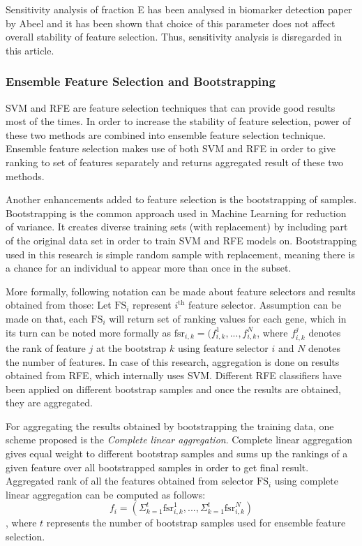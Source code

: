 \documentclass{ba-kecs}
\numberwithin{figure}{section}
\numberwithin{equation}{section}
\begin{document}
Sensitivity analysis of fraction E has been analysed in biomarker detection paper by Abeel \cite{bootstrapping} and it has been shown that choice of this parameter does not affect overall stability of feature selection. Thus, sensitivity analysis is disregarded in this article.



\subsubsection{Ensemble Feature Selection and Bootstrapping}

SVM and RFE are feature selection techniques that can provide good results most of the times. In order to increase the stability of feature selection, power of these two methods are combined into ensemble feature selection technique. Ensemble feature selection makes use of both SVM and RFE in order to give ranking to set of features separately and returns aggregated result of these two methods.

Another enhancements added to feature selection is the bootstrapping of samples. Bootstrapping is the common approach used in Machine Learning for reduction of variance. It creates diverse training sets (with replacement) by including part of the original data set in order to train SVM and RFE models on. Bootstrapping used in this research is simple random sample with replacement, meaning there is a chance for an individual to appear more than once in the subset. 

More formally, following notation can be made about feature selectors and results obtained from those: Let $\mathrm{FS}_{i}$ represent $i^{\mathrm{th}}$ feature selector. Assumption can be made on that, each $\mathrm{FS}_{i}$ will return set of ranking values for each gene, which in its turn can be noted more formally as $\mathrm{fsr}_{i,k} = (f_{i,k}^{1},...,f_{i,k}^{N}$, where $f_{i,k}^{j}$ denotes the rank of feature $j$ at the bootstrap $k$ using feature selector $i$ and $N$ denotes the number of features. In case of this research, aggregation is done on results obtained from RFE, which internally uses SVM. Different RFE classifiers have been applied on different bootstrap samples and once the results are obtained, they are aggregated. 

For aggregating the results obtained by bootstrapping the training data, one scheme proposed is the \textit{Complete linear aggregation}. Complete linear aggregation gives equal weight to different bootstrap samples and sums up the rankings of a given feature over all bootstrapped samples in order to get final result. Aggregated rank of all the features obtained from selector $\mathrm{FS}_{i}$ using complete linear aggregation can be computed as follows:
\begin{equation}
f_{i} = (\Sigma_{k = 1}^{t} \mathrm{fsr}_{i,k}^{1},...,\Sigma_{k = 1}^{t} \mathrm{fsr}_{i,k}^{N})
\end{equation}
, where $t$ represents the number of bootstrap samples used for ensemble feature selection. 
\end{document}

